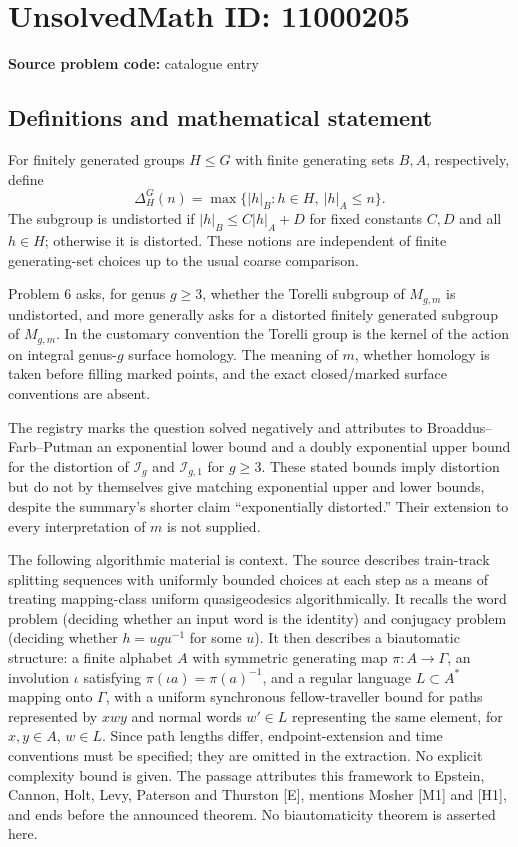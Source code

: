 \documentclass[11pt]{article}
\begin{document}
\section*{UnsolvedMath ID: 11000205}
\textbf{Source problem code:} catalogue entry
\subsection{Definitions and mathematical statement}
For finitely generated groups $H\leq G$ with finite generating sets $B,A$, respectively, define
\[
 \Delta_H^G(n)=\max\{|h|_B:h\in H,\ |h|_A\leq n\}.
\]
The subgroup is undistorted if $|h|_B\leq C|h|_A+D$ for fixed constants $C,D$ and all $h\in H$; otherwise it is distorted. These notions are independent of finite generating-set choices up to the usual coarse comparison.

Problem 6 asks, for genus $g\geq3$, whether the Torelli subgroup of $M_{g,m}$ is undistorted, and more generally asks for a distorted finitely generated subgroup of $M_{g,m}$. In the customary convention the Torelli group is the kernel of the action on integral genus-$g$ surface homology. The meaning of $m$, whether homology is taken before filling marked points, and the exact closed/marked surface conventions are absent.

The registry marks the question solved negatively and attributes to Broaddus--Farb--Putman an exponential lower bound and a doubly exponential upper bound for the distortion of $\mathcal I_g$ and $\mathcal I_{g,1}$ for $g\geq3$. These stated bounds imply distortion but do not by themselves give matching exponential upper and lower bounds, despite the summary's shorter claim ``exponentially distorted.'' Their extension to every interpretation of $m$ is not supplied.

The following algorithmic material is context. The source describes train-track splitting sequences with uniformly bounded choices at each step as a means of treating mapping-class uniform quasigeodesics algorithmically. It recalls the word problem (deciding whether an input word is the identity) and conjugacy problem (deciding whether $h=ugu^{-1}$ for some $u$). It then describes a biautomatic structure: a finite alphabet $A$ with symmetric generating map $\pi:A\to\Gamma$, an involution $\iota$ satisfying $\pi(\iota a)=\pi(a)^{-1}$, and a regular language $L\subset A^*$ mapping onto $\Gamma$, with a uniform synchronous fellow-traveller bound for paths represented by $xwy$ and normal words $w'\in L$ representing the same element, for $x,y\in A$, $w\in L$. Since path lengths differ, endpoint-extension and time conventions must be specified; they are omitted in the extraction. No explicit complexity bound is given. The passage attributes this framework to Epstein, Cannon, Holt, Levy, Paterson and Thurston [E], mentions Mosher [M1] and [H1], and ends before the announced theorem. No biautomaticity theorem is asserted here.
\end{document}
